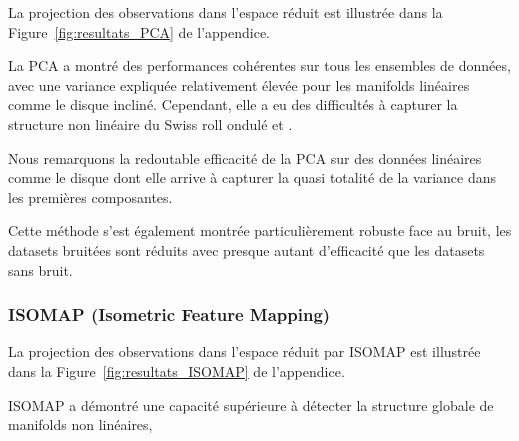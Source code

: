 \documentclass[unnumsec,webpdf,modern,large]{projet_manifold}%
\theoremstyle{thmstyleone}%
\theoremstyle{thmstyletwo}%
\theoremstyle{thmstylethree}%
\begin{document}
La projection des observations dans l'espace réduit est illustrée dans la Figure~\ref{fig:resultats_PCA} de l'appendice.

La PCA a montré des performances cohérentes sur tous les ensembles de données, avec une variance expliquée relativement élevée pour les manifolds linéaires comme le disque incliné. Cependant, elle a eu des difficultés à capturer la structure non linéaire du Swiss roll ondulé et .

\begin{table}[htbp]
\centering
\caption{Somme des variances expliquées (\%) pour les 2 premiers axes PCA}
\label{tab:pca_variances}
\end{table}

Nous remarquons la redoutable efficacité de la PCA sur des données linéaires comme  le disque dont elle arrive à capturer la quasi totalité de la variance dans les premières composantes.

Cette méthode s'est également montrée particulièrement robuste face au bruit, les datasets bruitées sont réduits avec presque autant d'efficacité que les datasets sans bruit. 





\subsubsection{ISOMAP (Isometric Feature Mapping)}

La projection des observations dans l'espace réduit par ISOMAP est illustrée dans la Figure~\ref{fig:resultats_ISOMAP} de l'appendice.

ISOMAP a démontré une capacité supérieure à détecter la structure globale de manifolds non linéaires, 
\end{document}
